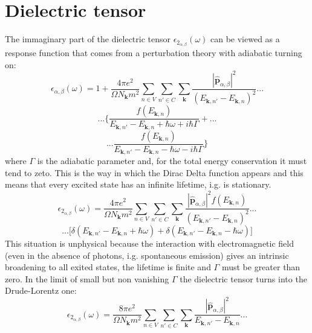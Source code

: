 \documentclass[twocolumn]{article}
\begin{document}
\section{Dielectric tensor}
The immaginary part of the dielectric tensor $\epsilon_{2_{\alpha,\beta}}(\omega)$ can be viewed as a response function 
that comes from a perturbation theory with adiabatic turning on:
\begin{displaymath}
\epsilon_{\alpha,\beta}(\omega)=1+\frac{4 \pi e^2}{\Omega N_{\textbf{k}} m^2}\sum_{n\in V}\sum_{n'\in C}\sum_{\textbf{k}}
\frac{|\hat{\textbf{p}}_{\alpha,\beta}|^2}{(E_{\textbf{k},n'}-E_{\textbf{k},n})^2}...
\end{displaymath}
\begin{displaymath}
...\Bigg\{\frac{f(E_{\textbf{k},n})}{E_{\textbf{k},n'}-E_{\textbf{k},n}+\hbar\omega+i\hbar\Gamma}+...
\end{displaymath}
\begin{equation}
...\frac{f(E_{\textbf{k},n})}{E_{\textbf{k},n'}-E_{\textbf{k},n}-\hbar\omega-i\hbar\Gamma}\Bigg\}
\end{equation}
where $\Gamma$ is the adiabatic parameter and, for the total energy conservation it must tend to zeto. This is the way in 
which the Dirac Delta function appears and this means that every excited state has an infinite lifetime, i.g. is stationary. 
\begin{displaymath}
\epsilon_{2_{\alpha,\beta}}(\omega)=\frac{4 \pi e^2}{\Omega N_{\textbf{k}} m^2}\sum_{n\in V}\sum_{n'\in C}\sum_{\textbf{k}}
\frac{|\hat{\textbf{p}}_{\alpha,\beta}|^2 f(E_{\textbf{k},n})}{(E_{\textbf{k},n'}-E_{\textbf{k},n})^2}...
\end{displaymath}
\begin{equation}
...\bigg[\delta(E_{\textbf{k},n'}-E_{\textbf{k},n}+\hbar\omega)+\delta(E_{\textbf{k},n'}-
E_{\textbf{k},n}-\hbar\omega)\bigg]
\end{equation}
This situation is unphysical because the interaction with 
electromagnetic field (even in the absence of photons, i.g. spontaneous emission) gives an intrinsic broadening to all exited 
states, the lifetime is finite and $\Gamma$ must be greater than zero. In the limit of small but non vanishing $\Gamma$ 
the dielectric tensor turns into the Drude-Lorentz one: 
\begin{displaymath}
\epsilon_{2_{\alpha,\beta}}(\omega)=\frac{8 \pi e^2}{\Omega N_{\textbf{k}} m^2}\sum_{n\in V}\sum_{n'\in C}\sum_{\textbf{k}}
\frac{|\hat{\textbf{p}}_{\alpha,\beta}|^2}{E_{\textbf{k},n'}-E_{\textbf{k},n}}...
\end{displaymath}
\end{document}
